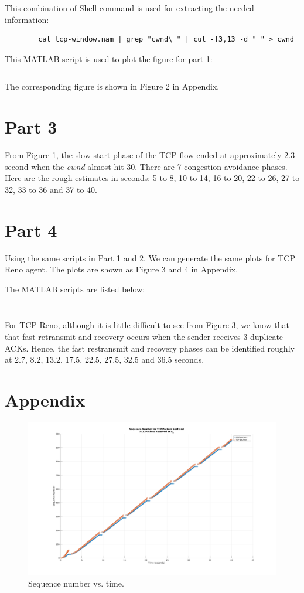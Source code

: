 \documentclass{article}
\begin{document}
	This combination of Shell command is used for extracting the needed
	information:
	\begin{verbatim}
		cat tcp-window.nam | grep "cwnd\_" | cut -f3,13 -d " " > cwnd
	\end{verbatim}
	
	This MATLAB script is used to plot the figure for part 1:
	\inputminted[tabsize=2,breaklines]{matlab}{proj1\_p2.m}

	The corresponding figure is shown in Figure 2 in Appendix.

\section*{Part 3}
	From Figure 1, the slow start phase of the TCP flow ended at approximately
	2.3 second when the \emph{cwnd} almost hit 30. There are 7 congestion
	avoidance phases. Here are the rough estimates in seconds: 5 to 8, 10 to 14,
	16 to 20, 22 to 26, 27 to 32, 33 to 36 and 37 to 40.

\section*{Part 4}
	Using the same scripts in Part 1 and 2. We can generate the same plots for TCP
	Reno agent. The plots are shown as Figure 3 and 4 in Appendix.

	The MATLAB scripts are listed below:
	\inputminted[tabsize=2,breaklines]{matlab}{proj1\_p3.m}
	\inputminted[tabsize=2,breaklines]{matlab}{proj1\_p4.m}

	For TCP Reno, although it is little difficult to see from Figure 3, we know
	that that fast retransmit and recovery occurs when the sender receives 3
	duplicate ACKs. Hence, the fast restransmit and recovery phases can be
	identified roughly at 2.7, 8.2, 13.2, 17.5, 22.5, 27.5, 32.5 and 36.5 seconds.
	\pagebreak

\section*{Appendix}
	\begin{figure}[!hbt]
		\centering
		\includegraphics[width=0.85\linewidth]{proj2_p1.png}
		\caption{Sequence number vs. time.}
	\end{figure}
\end{document}
